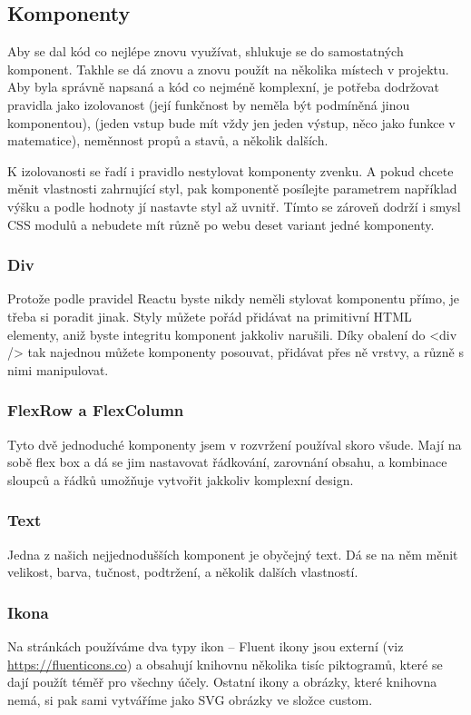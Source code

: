 \subsection{Komponenty}

Aby se dal kód co nejlépe znovu využívat, shlukuje se do samostatných komponent. Takhle se dá znovu a znovu použít na několika místech v projektu. Aby byla správně napsaná a kód co nejméně komplexní, je potřeba dodržovat pravidla jako izolovanost (její funkčnost by neměla být podmíněná jinou komponentou),  (jeden vstup bude mít vždy jen jeden výstup, něco jako funkce v matematice), neměnnost propů a stavů, a několik dalších. 

K izolovanosti se řadí i pravidlo nestylovat komponenty zvenku. A pokud chcete měnit vlastnosti zahrnující styl, pak komponentě posílejte parametrem například výšku a podle hodnoty jí nastavte styl až uvnitř. Tímto se zároveň dodrží i smysl CSS modulů a nebudete mít různě po webu deset variant jedné komponenty.

\subsubsection{Div}
Protože podle pravidel Reactu byste nikdy neměli stylovat komponentu přímo, je třeba si poradit jinak. Styly můžete pořád přidávat na primitivní HTML elementy, aniž byste integritu komponent jakkoliv narušili. Díky obalení do <div /> tak najednou můžete komponenty posouvat, přidávat přes ně vrstvy, a různě s nimi manipulovat.

\subsubsection{FlexRow a FlexColumn}
Tyto dvě jednoduché komponenty jsem v rozvržení používal skoro všude. Mají na sobě flex box a dá se jim nastavovat řádkování, zarovnání obsahu, a kombinace sloupců a řádků umožňuje vytvořit jakkoliv komplexní design.

\subsubsection{Text}
Jedna z našich nejjednodušších komponent je obyčejný text. Dá se na něm měnit velikost, barva, tučnost, podtržení, a několik dalších vlastností.

\subsubsection{Ikona}
Na stránkách používáme dva typy ikon – Fluent ikony jsou externí (viz \href{https://fluenticons.co}{https://fluenticons.co}) a obsahují knihovnu několika tisíc piktogramů, které se dají použít téměř pro všechny účely. Ostatní ikony a obrázky, které knihovna nemá, si pak sami vytváříme jako SVG obrázky ve složce custom.

